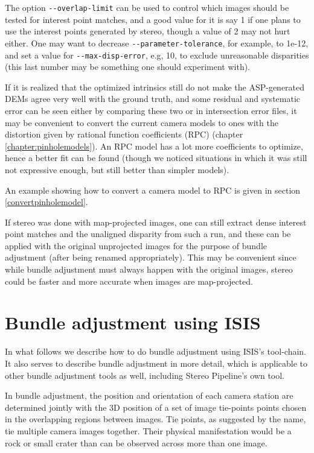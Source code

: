 The option \texttt{-\/-overlap-limit} can be used to control which images should be
tested for interest point matches, and a good value for it is say 1 if
one plans to use the interest points generated by stereo, though a value
of 2 may not hurt either. One may want to decrease
\texttt{-\/-parameter-tolerance}, for example, to 1e-12, and set a value
for \texttt{-\/-max-disp-error}, e.g, 10, to exclude unreasonable
disparities (this last number may be something one should experiment with).

If it is realized that the optimized intrinsics still do not make the ASP-generated
DEMs agree very well with the ground truth, and some residual and systematic error can be seen
either by comparing these two or in intersection error files, it may be convenient
to convert the current camera models to ones with the distortion given by rational function
coefficients (RPC) (chapter \ref{chapter:pinholemodels}). An RPC model has a lot more
coefficients to optimize, hence a better fit can be found (though we noticed situations 
in which it was still not expressive enough, but still better than simpler models). 

An example showing how to convert a camera model to RPC is given in
section \ref{convertpinholemodel}.

If stereo was done with map-projected images, one can still extract 
dense interest point matches and the unaligned disparity from such a run,
and these can be applied with the original unprojected images for the purpose
of bundle adjustment (after being renamed appropriately). This may be convenient
since while bundle adjustment must always happen with the original images, 
stereo could be faster and more accurate when images are map-projected.

\section{Bundle adjustment using ISIS}

In what follows we describe how to do bundle adjustment using
\ac{ISIS}'s tool-chain. It also serves to describe bundle adjustment in more
detail, which is applicable to other bundle adjustment tools as well,
including Stereo Pipeline's own tool.

In bundle adjustment, the position and orientation of each camera
station are determined jointly with the 3D position of a set of image
tie-points points chosen in the overlapping regions between
images. Tie points, as suggested by the name, tie multiple camera images
together. Their physical manifestation would be a rock or small crater
than can be observed across more than one image.

